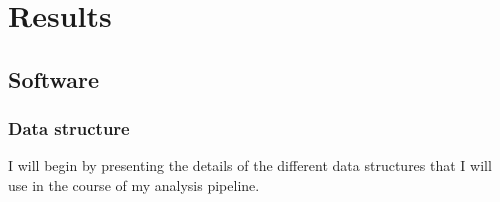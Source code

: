 \chapter{Results}

\section{Software}
\subsection{Data structure}
I will begin by presenting the details of the different data structures that I will use in the course of my analysis pipeline.

